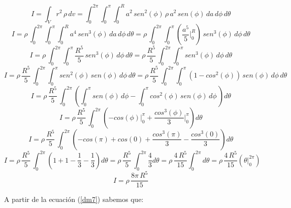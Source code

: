 \documentclass[letter,11pt]{article}
\begin{document}
\begin{equation*}
    I = \int_{V} r^2\, \rho\, dv = \int_{0}^{2\pi} \int_{0}^{\pi} \int_{0}^{R} a^2\, sen^2(\phi)\, \rho\, a^2\, sen (\phi)\, da\, d\phi\, d\theta
\end{equation*}
\begin{equation*}
    I = \rho\, \int_{0}^{2\pi} \int_{0}^{\pi} \int_{0}^{R} a^4\, sen^3(\phi)\, da\, d\phi\, d\theta = \rho\, \int_{0}^{2\pi} \int_{0}^{\pi} \left(\frac{a^5}{5}\Biggr|_{0}^{R}\right)\, sen^3(\phi)\, d\phi\, d\theta
\end{equation*}
\begin{equation*}
    I = \rho\, \int_{0}^{2\pi} \int_{0}^{\pi} \frac{R^5}{5}\, sen^3(\phi)\, d\phi\, d\theta = \rho\, \frac{R^5}{5}\, \int_{0}^{2\pi} \int_{0}^{\pi} sen^3(\phi)\, d\phi\, d\theta
\end{equation*}
\begin{equation*}
    I = \rho\, \frac{R^5}{5}\, \int_{0}^{2\pi} \int_{0}^{\pi} sen^2(\phi)\, sen(\phi)\, d\phi\, d\theta = \rho\, \frac{R^5}{5}\, \int_{0}^{2\pi} \int_{0}^{\pi} (1 - cos^2(\phi))\, sen(\phi)\, d\phi\, d\theta
\end{equation*}
\begin{equation*}
    I = \rho\, \frac{R^5}{5}\, \int_{0}^{2\pi} \left( \int_{0}^{\pi} sen(\phi)\, d\phi - \int_{0}^{\pi} cos^2(\phi)\, sen(\phi)\, d\phi\, \right) d\theta
\end{equation*}
\begin{equation*}
    I = \rho\, \frac{R^5}{5}\, \int_{0}^{2\pi} \left( -cos(\phi)\Biggr|_{0}^{\pi} + \frac{cos^3(\phi)}{3}\Biggr|_{0}^{\pi} \right) d\theta
\end{equation*}
\begin{equation*}
    I = \rho\, \frac{R^5}{5}\, \int_{0}^{2\pi} \left( -cos(\pi) + cos(0) + \frac{cos^3(\pi)}{3} - \frac{cos^3(0)}{3} \right) d\theta
\end{equation*}
\begin{equation*}
    I = \rho\, \frac{R^5}{5}\, \int_{0}^{2\pi} \left( 1 + 1 - \frac{1}{3} - \frac{1}{3} \right) d\theta = \rho\, \frac{R^5}{5}\, \int_{0}^{2\pi} \frac{4}{3} d\theta = \rho\, \frac{4\, R^5}{15} \int_{0}^{2\pi} d\theta = \rho\, \frac{4\, R^5}{15} ( \theta \Biggr|_{0}^{2\pi} )
\end{equation*}
\begin{equation}
    I = \rho\, \frac{8\pi\, R^5}{15}
\label{resultado7}
\end{equation}

A partir de la ecuación (\ref{dm7}) sabemos que:
\end{document}
